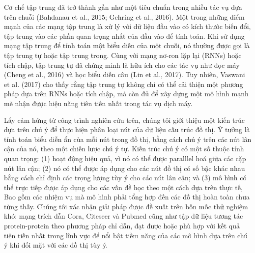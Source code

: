 Cơ chế tập trung đã trở thành gần như một tiêu chuẩn trong nhiều tác vụ dựa trên chuỗi (Bahdanau et al., 2015; Gehring et al., 2016). Một trong những điểm mạnh của các mạng tập trung là xử lý với dữ liệu đầu vào có kích thước biến đổi, tập trung vào các phần quan trọng nhất của đầu vào để tính toán. Khi sử dụng mạng tập trung để tính toán một biểu diễn của một chuỗi, nó thường được gọi là tập trung tự hoặc tập trung trong. Cùng với mạng nơ-ron lặp lại (RNNs) hoặc tích chập, tập trung tự đã chứng minh là hữu ích cho các tác vụ như đọc máy (Cheng et al., 2016) và học biểu diễn câu (Lin et al., 2017). Tuy nhiên, Vaswani et al. (2017) cho thấy rằng tập trung tự không chỉ có thể cải thiện một phương pháp dựa trên RNNs hoặc tích chập, mà còn đủ để xây dựng một mô hình mạnh mẽ nhận được hiệu năng tiên tiến nhất trong tác vụ dịch máy.

Lấy cảm hứng từ công trình nghiên cứu trên, chúng tôi giới thiệu một kiến trúc dựa trên chú ý để thực hiện phân loại nút của dữ liệu cấu trúc đồ thị. Ý tưởng là tính toán biểu diễn ẩn của mỗi nút trong đồ thị, bằng cách chú ý trên các nút lân cận của nó, theo một chiến lược chú ý tự. Kiến trúc chú ý có một số thuộc tính quan trọng: (1) hoạt động hiệu quả, vì nó có thể được paralllel hoá giữa các cặp nút lân cận; (2) nó có thể được áp dụng cho các nút đồ thị có số bậc khác nhau bằng cách chỉ định các trọng lượng tùy ý cho các nút lân cận; và (3) mô hình có thể trực tiếp được áp dụng cho các vấn đề học theo một cách dựa trên thực tế, Bao gồm các nhiệm vụ mà mô hình phải tổng hợp đến các đồ thị hoàn toàn chưa từng thấy. Chúng tôi xác nhận giải pháp được đề xuất trên bốn mốc thử nghiệm khó: mạng trích dẫn Cora, Citeseer và Pubmed cũng như tập dữ liệu tương tác protein-protein theo phương pháp chỉ dẫn, đạt được hoặc phù hợp với kết quả tiên tiến nhất trong lĩnh vực để nổi bật tiềm năng của các mô hình dựa trên chú ý khi đối mặt với các đồ thị tùy ý.

